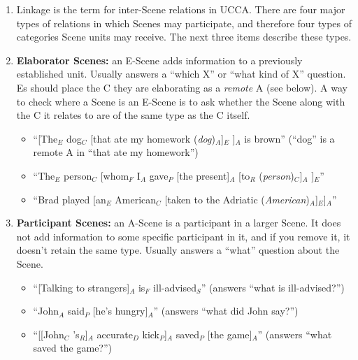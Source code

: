 \documentclass[11pt]{article}
\newcommand{\dcom}[1]{\textit{\color{blue}{#1}}}
\newcommand{\rem}[1]{{(\it #1})}
\begin{document}
\begin{enumerate}
  
\item
  Linkage is the term for inter-Scene relations in UCCA. There are four major types of 
  relations in
  which Scenes may participate, and therefore four types of categories Scene units may 
  receive.
  The next three items describe these types.
  
\item
  \textbf{Elaborator Scenes:} an E-Scene adds information to a previously established 
  unit. Usually answers
  a ``which X'' or ``what kind of X'' question. Es should place the C they are 
  elaborating as a {\it remote} A (see below).
  A way to check where a Scene is an E-Scene is to ask whether the Scene along with the C 
  it relates to are
  of the same type as the C itself.

  \begin{itemize}
  \item
    ``[The$_E$ dog$_C$ [that ate my homework \rem{dog}$_A$]$_{E}$ ]$_A$ is brown'' 
    (``dog'' is a remote A in ``that ate my homework'')
  \item
    ``The$_E$ person$_C$ [whom$_F$ I$_A$ gave$_P$ [the present]$_A$ [to$_R$ 	
        \rem{person}$_C$]$_A$ ]$_{E}$''
  \item
    ``Brad played [an$_E$ American$_C$ [taken to the Adriatic 	
    	\rem{American}$_A$]$_{E}$]$_A$''
  \end{itemize}

\item
  \textbf{Participant Scenes:} an A-Scene is a participant in a larger Scene. It does not add 	information to some specific participant in it, and if you remove it, it doesn't retain the same type. Usually answers a ``what'' question about the Scene.
  
  \begin{itemize}
  \item
    ``[Talking to strangers]$_A$ is$_F$ ill-advised$_S$'' (answers ``what is ill-advised?'')
  \item
    ``John$_A$ said$_P$ [he's hungry]$_A$'' (answers ``what did John say?'')
  \item
    ``[[John$_C$ 's$_R$]$_A$ accurate$_D$ kick$_P$]$_A$ saved$_P$ [the game]$_A$'' (answers ``what saved the game?'')
  \end{itemize}
  

\end{enumerate}
\end{document}
